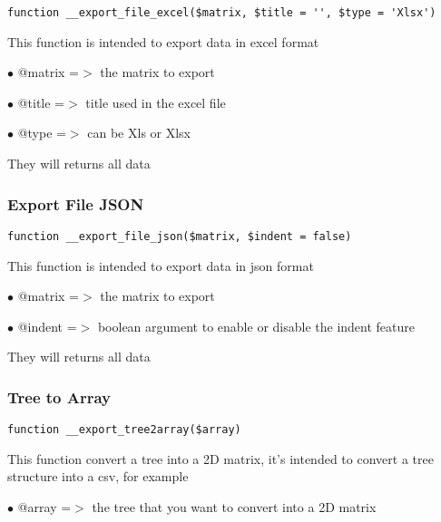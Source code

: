 \documentclass[a4paper]{article}
\begin{document}
\begin{lstlisting}
function __export_file_excel($matrix, $title = '', $type = 'Xlsx')
\end{lstlisting}

This function is intended to export data in excel format

\begin{compactitem}
\item[\color{myblue}$\bullet$] @matrix =$>$ the matrix to export
\item[\color{myblue}$\bullet$] @title  =$>$ title used in the excel file
\item[\color{myblue}$\bullet$] @type   =$>$ can be Xls or Xlsx
\end{compactitem}

They will returns all data

\hypertarget{toc443}{}
\subsubsection{Export File JSON}

\begin{lstlisting}
function __export_file_json($matrix, $indent = false)
\end{lstlisting}

This function is intended to export data in json format

\begin{compactitem}
\item[\color{myblue}$\bullet$] @matrix =$>$ the matrix to export
\item[\color{myblue}$\bullet$] @indent =$>$ boolean argument to enable or disable the indent feature
\end{compactitem}

They will returns all data

\hypertarget{toc444}{}
\subsubsection{Tree to Array}

\begin{lstlisting}
function __export_tree2array($array)
\end{lstlisting}

This function convert a tree into a 2D matrix, it's intended to convert
a tree structure into a csv, for example

\begin{compactitem}
\item[\color{myblue}$\bullet$] @array =$>$ the tree that you want to convert into a 2D matrix
\end{compactitem}
\end{document}
